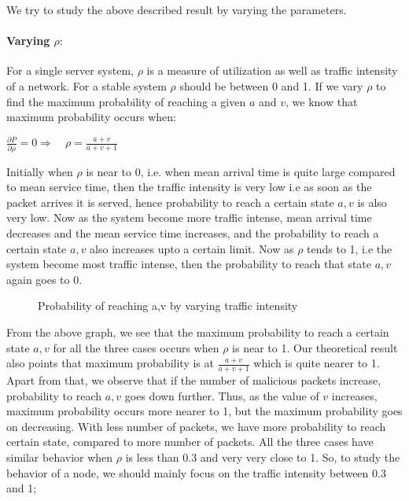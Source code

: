 We try to study the above described result by varying the parameters. 

\paragraph{Varying $\rho :$}

For a single server system, $\rho$ is a measure of utilization as well as traffic intensity of a network. For a stable system $\rho$ should be between 0 and 1. If we vary $\rho$ to find the maximum probability of reaching a given $a$ and $v$, we know that maximum probability occurs when:
\begin{center}
$\frac{\partial P}{\partial \rho} = 0 \Rightarrow\quad \rho= \frac{a+v}{a+v+1}$ 
\end{center}

Initially when $\rho$ is near to 0, i.e. when mean arrival time is quite large compared to mean service time, then the traffic intensity is very low i.e as soon as the packet arrives it is served, hence probability to reach a certain state $a,v$ is also very low. Now as the system become more traffic intense, mean arrival time decreases and the mean service time increases, and the probability to reach a certain state $a,v$ also increases upto a certain limit. Now as $\rho$ tends to 1, i.e the system become most traffic intense, then the probability to reach that state $a,v$ again goes to 0. 

\begin{figure}[H]
		\centering
		\caption{{Probability of reaching a,v by varying traffic intensity }}
		\label{fig:figa}
\end{figure}

From the above graph, we see that the maximum probability to reach a certain state $a,v$ for all the three cases occurs when $\rho$ is near to 1. Our theoretical result also points that maximum probability is at $\frac{a+v}{a+v+1}$ which is quite nearer to 1. Apart from that, we observe that if the number of malicious packets increase, probability to reach $a,v$ goes down further. Thus, as the value of $v$ increases, maximum probability occurs more nearer to 1, but the maximum probability goes on decreasing. With less number of packets, we have more probability to reach certain state, compared to more number of packets. All the three cases have similar behavior when $\rho$ is less than 0.3 and very very close to 1. So, to study the behavior of a node, we should mainly focus on the traffic intensity between 0.3 and 1;   

